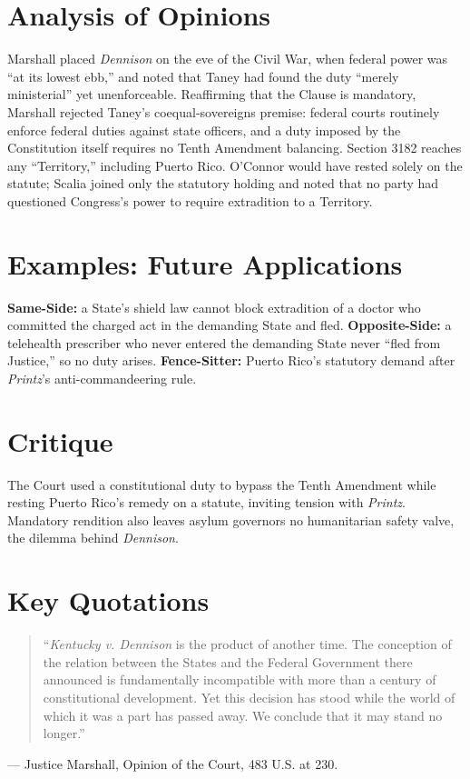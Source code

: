 \documentclass[12pt]{article}
\begin{document}
\section{Analysis of Opinions}
Marshall placed \textit{Dennison} on the eve of the Civil War, when federal power was ``at its lowest ebb,'' and noted that Taney had found the duty ``merely ministerial'' yet unenforceable. Reaffirming that the Clause is mandatory, Marshall rejected Taney's coequal-sovereigns premise: federal courts routinely enforce federal duties against state officers, and a duty imposed by the Constitution itself requires no Tenth Amendment balancing. Section 3182 reaches any ``Territory,'' including Puerto Rico. O'Connor would have rested solely on the statute; Scalia joined only the statutory holding and noted that no party had questioned Congress's power to require extradition to a Territory.

\section{Examples: Future Applications}
\textbf{Same-Side:} a State's shield law cannot block extradition of a doctor who committed the charged act in the demanding State and fled. \textbf{Opposite-Side:} a telehealth prescriber who never entered the demanding State never ``fled from Justice,'' so no duty arises. \textbf{Fence-Sitter:} Puerto Rico's statutory demand after \textit{Printz}'s anti-commandeering rule.

\section{Critique}
The Court used a constitutional duty to bypass the Tenth Amendment while resting Puerto Rico's remedy on a statute, inviting tension with \textit{Printz}. Mandatory rendition also leaves asylum governors no humanitarian safety valve, the dilemma behind \textit{Dennison}.

\section{Key Quotations}
\begin{quote}
``\emph{Kentucky v. Dennison} is the product of another time. The conception of the relation between the States and the Federal Government there announced is fundamentally incompatible with more than a century of constitutional development. Yet this decision has stood while the world of which it was a part has passed away. We conclude that it may stand no longer.''
\end{quote}
\noindent --- Justice Marshall, Opinion of the Court, 483 U.S. at 230.
\end{document}
